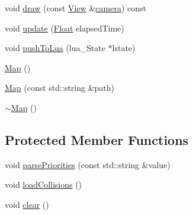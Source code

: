 \begin{DoxyCompactItemize}
\item 
void \hyperlink{classZeta_1_1Map_a6c37c6a69fd3749b894f28ed8fdbb2d8}{draw} (const \hyperlink{classZeta_1_1View}{View} \&\hyperlink{classZeta_1_1Map_a9b9106c7c9476767a019f2a0a6a6e29b}{camera}) const 
\item 
void \hyperlink{classZeta_1_1Map_a7b3aa19b060050a5657c169cc7aa996e}{update} (\hyperlink{namespaceZeta_a1e0a1265f9b3bd3075fb0fabd39088ba}{Float} elapsed\+Time)
\item 
void \hyperlink{classZeta_1_1Map_a68b88003b8c3bcae76bdd4c4246002e6}{push\+To\+Lua} (lua\+\_\+\+State $\ast$lstate)
\item 
\hyperlink{classZeta_1_1Map_a68f3f5be0dd1a6fce4d2a6d0002bd5eb}{Map} ()
\item 
\hyperlink{classZeta_1_1Map_a0445d64bdcedf4f5f3340ef647ad4fa7}{Map} (const std\+::string \&path)
\item 
\hyperlink{classZeta_1_1Map_ac89422bb05ffd8b5f90752061c24ec76}{$\sim$\+Map} ()
\end{DoxyCompactItemize}
\subsection*{Protected Member Functions}
\begin{DoxyCompactItemize}
\item 
void \hyperlink{classZeta_1_1Map_ad50855a750ca319974e3cbecf906f816}{parse\+Priorities} (const std\+::string \&value)
\item 
void \hyperlink{classZeta_1_1Map_a83fcba0d3acc11658c8ac474312b6211}{load\+Collisions} ()
\item 
void \hyperlink{classZeta_1_1Map_a4aabbc3524b483d07aae5416d96e3c17}{clear} ()
\end{DoxyCompactItemize}
